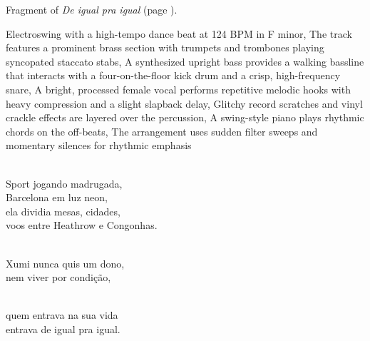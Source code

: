 
\begin{notes}
Fragment of \emph{De igual pra igual} (page \pageref{sec:de-igual-pra-igual}).
\end{notes}
\begin{style}
Electroswing with a high-tempo dance beat at 124 BPM in F minor, The track features a prominent brass section with trumpets and trombones playing syncopated staccato stabs, A synthesized upright bass provides a walking bassline that interacts with a four-on-the-floor kick drum and a crisp, high-frequency snare, A bright, processed female vocal performs repetitive melodic hooks with heavy compression and a slight slapback delay, Glitchy record scratches and vinyl crackle effects are layered over the percussion, A swing-style piano plays rhythmic chords on the off-beats, The arrangement uses sudden filter sweeps and momentary silences for rhythmic emphasis
\end{style}
\begin{lyrics}
\\
Sport jogando madrugada,\\
Barcelona em luz neon,
\\
ela dividia mesas, cidades,
\\
voos entre Heathrow e Congonhas.

\\
Xumi nunca quis um dono,\\
nem viver por condição,

\\
quem entrava na sua vida\\
entrava de igual pra igual.
\end{lyrics}

